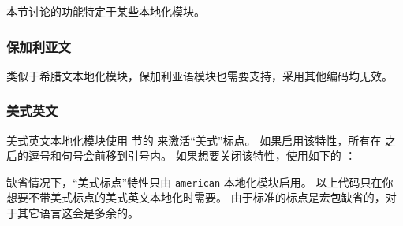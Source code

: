 本节讨论的功能特定于某些本地化模块。

\subsubsection{保加利亚文}
\label{use:loc:bul}

类似于希腊文本地化模块，保加利亚语模块也需要\utf 支持，采用其他编码均无效。

\subsubsection{美式英文}
\label{use:loc:us}


美式英文本地化模块使用  节的  来激活“美式”标点。
如果启用该特性，所有在  之后的逗号和句号会前移到引号内。
如果想要关闭该特性，使用如下的 ：

\begin{ltxexample}
\end{ltxexample}
%
缺省情况下，“美式标点”特性只由 \texttt{american} 本地化模块启用。
以上代码只在你想要不带美式标点的美式英文本地化时需要。
由于标准的标点是宏包缺省的，对于其它语言这会是多余的。


